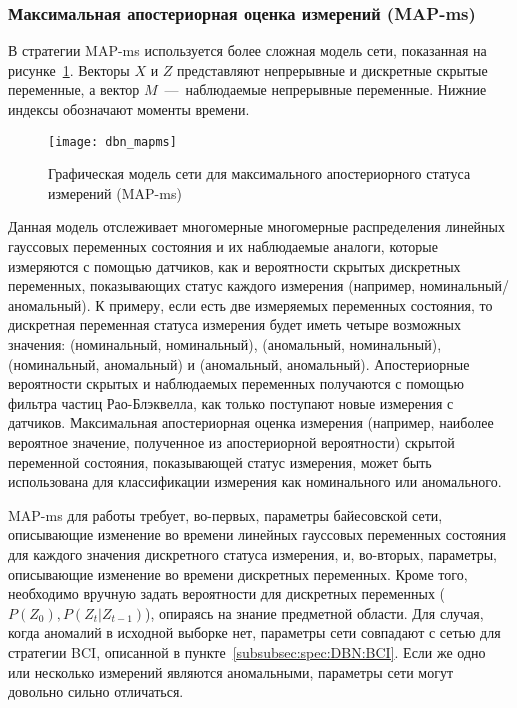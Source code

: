 \subsubsection{Максимальная апостериорная оценка измерений (MAP-ms)}
В стратегии MAP-ms используется более сложная модель сети, показанная на рисунке~\ref{fig:spec:DBN:MAPms}. Векторы $X$ и $Z$ представляют непрерывные и дискретные скрытые переменные, а вектор $M$~---~наблюдаемые непрерывные переменные. Нижние индексы обозначают моменты времени.

\begin{figure}[h]
\texttt{[image: dbn\_mapms]}
\caption{Графическая модель сети для максимального апостериорного статуса измерений (MAP-ms)}
\label{fig:spec:DBN:MAPms}
\end{figure}

Данная модель отслеживает многомерные многомерные распределения линейных гауссовых переменных состояния и их наблюдаемые аналоги, которые измеряются с помощью датчиков, как и вероятности скрытых дискретных переменных, показывающих статус каждого измерения (например, номинальный/аномальный). К примеру, если есть две измеряемых переменных состояния, то дискретная переменная статуса измерения будет иметь четыре возможных значения: (номинальный, номинальный), (аномальный, номинальный), (номинальный, аномальный) и (аномальный, аномальный). Апостериорные вероятности скрытых и наблюдаемых переменных получаются с помощью фильтра частиц Рао-Блэквелла, как только поступают новые измерения с датчиков. Максимальная апостериорная оценка измерения (например, наиболее вероятное значение, полученное из апостериорной вероятности) скрытой переменной состояния, показывающей статус измерения, может быть использована для классификации измерения как номинального или аномального. 

MAP-ms для работы требует, во-первых, параметры байесовской сети, описывающие изменение во времени линейных гауссовых переменных состояния для каждого значения дискретного статуса измерения, и, во-вторых, параметры, описывающие изменение во времени дискретных переменных. Кроме того, необходимо вручную задать вероятности для дискретных переменных ($P(Z_0), P(Z_t|Z_{t-1})$), опираясь на знание предметной области. Для случая, когда аномалий в исходной выборке нет, параметры сети совпадают с сетью для стратегии BCI, описанной в пункте~\ref{subsubsec:spec:DBN:BCI}. Если же одно или несколько измерений являются аномальными, параметры сети могут довольно сильно отличаться.~\cite{DBNAnomalyDetection}


